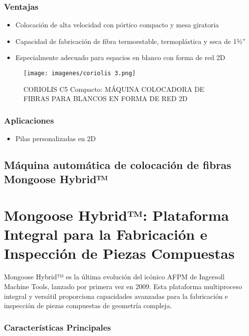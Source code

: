 \begin{enumerate}[label=\arabic*.]
\subsubsection{Ventajas}

\begin{itemize}
   \item Colocación de alta velocidad con pórtico compacto y mesa giratoria
    \item Capacidad de fabricación de fibra termoestable, termoplástica y seca de 1½”
    \item Especialmente adecuado para espacios en blanco con forma de red 2D
\end{itemize}


\begin{figure}[h]
    \centering
    \texttt{[image: imagenes/coriolis 3.png]}
    \caption{CORIOLIS C5 Compacto: MÁQUINA COLOCADORA DE FIBRAS
PARA BLANCOS EN FORMA DE RED 2D}
    \label{fig:enter-label}
\end{figure}


\subsubsection{Aplicaciones}
\begin{itemize}
    \item Pilas personalizadas en 2D
\end{itemize}

\subsection{Máquina automática de colocación de fibras Mongoose Hybrid™}

\section*{Mongoose Hybrid™: Plataforma Integral para la Fabricación e Inspección de Piezas Compuestas}

Mongoose Hybrid™ es la última evolución del icónico AFPM de Ingersoll Machine Tools, lanzado por primera vez en 2009. Esta plataforma multiproceso integral y versátil proporciona capacidades avanzadas para la fabricación e inspección de piezas compuestas de geometría compleja.

\subsubsection*{Características Principales}


\end{enumerate}

